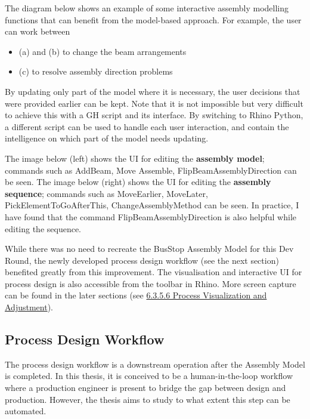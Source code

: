 

The diagram below shows an example of some interactive assembly modelling functions that can benefit from the model-based approach. For example, the user can work between

\begin{itemize}
	\item (a) and (b) to change the beam arrangements

	\item (c) to resolve assembly direction problems

\end{itemize}
By updating only part of the model where it is necessary, the user decisions that were provided earlier can be kept. Note that it is not impossible but very difficult to achieve this with a GH script and its interface. By switching to Rhino Python, a different script can be used to handle each user interaction, and contain the intelligence on which part of the model needs updating.



The image below (left) shows the UI for editing the \textbf{assembly model}; commands such as AddBeam, Move Assemble, FlipBeamAssemblyDirection can be seen. The image below (right) shows the UI for editing the \textbf{assembly sequence}; commands such as MoveEarlier, MoveLater, PickElementToGoAfterThis, ChangeAssemblyMethod can be seen. In practice, I have found that the command FlipBeamAssemblyDirection is also helpful while editing the sequence.



While there was no need to recreate the BusStop Assembly Model for this Dev Round, the newly developed process design workflow (see the next section) benefited greatly from this improvement. The visualisation and interactive UI for process design is also accessible from the toolbar in Rhino. More screen capture can be found in the later sections (see \ul{6.3.5.6 Process Visualization and Adjustment}).

\subsection{Process Design Workflow}

The process design workflow is a downstream operation after the Assembly Model is completed. In this thesis, it is conceived to be a human-in-the-loop workflow where a production engineer is present to bridge the gap between design and production. However, the thesis aims to study to what extent this step can be automated.

